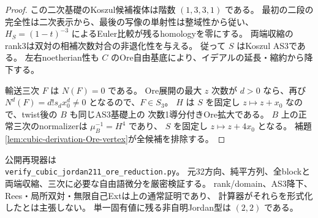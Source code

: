 \begin{proof}
この二次基礎のKoszul候補複体は階数 $(1,3,3,1)$ である。
最初の二段の完全性は二次表示から、最後の写像の単射性は整域性から従い、
$H_S=(1-t)^{-3}$ によるEuler比較が残るhomologyを零にする。
両端収縮のrank3は双対の相補次数対合の非退化性を与える。
従って $S$ はKoszul AS3である。
左右noetherian性も $C$ のOre自由基底により、イデアルの延長・縮約から降下する。

輸送三次 $F$ は $N(F)=0$ である。
Ore展開の最大 $z$ 次数が $d>0$ なら、再び $N^d(F)=d!s_dx_0^d\ne0$ となるので、$F\in S_3$。
$H$ は $S$ を固定し $z\mapsto z+x_0$ なので、twist後の $B$ も同じAS3基礎上の
次数1導分付きOre拡大である。
$B$ 上の正常三次のnormalizerは $\mu_B^{-1}=H^4$ であり、
$S$ を固定し $z\mapsto z+4x_0$ となる。
補題\ref{lem:cubic-derivation-Ore-vertex}が全候補を排除する。
\end{proof}
公開再現器は\\
\texttt{verify\_cubic\_jordan211\_ore\_reduction.py}。
元32方向、純平方列、全blockと両端収縮、三次に必要な自由語微分を厳密検証する。
rank/domain、AS3降下、Rees・局所双対・無限自己Extは上の通常証明であり、
計算器がそれらを形式化したとは主張しない。
単一固有値に残る非自明Jordan型は $(2,2)$ である。
